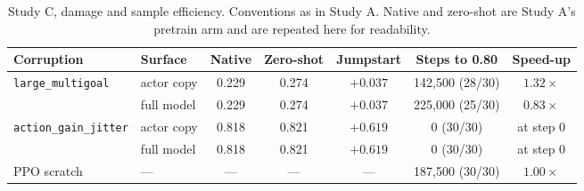 \begin{table}[htbp]
\centering
\setlength{\tabcolsep}{4pt}
\caption{Study C, damage and sample efficiency. Conventions as in Study A.
Native and zero-shot are Study A's pretrain arm and are repeated here for
readability.}
\small
\begin{tabular}{llccccc}
\toprule
Corruption & Surface & Native & Zero-shot & Jumpstart & Steps to 0.80 & Speed-up \\
\midrule
\texttt{large\_multigoal} & actor copy & 0.229 & 0.274 & $+0.037$ & 142,500 (28/30) & $1.32\times$ \\
 & full model & 0.229 & 0.274 & $+0.037$ & 225,000 (25/30) & $0.83\times$ \\
\midrule
\texttt{action\_gain\_jitter} & actor copy & 0.818 & 0.821 & $+0.619$ & 0 (30/30) & at step 0 \\
 & full model & 0.818 & 0.821 & $+0.619$ & 0 (30/30) & at step 0 \\
\midrule
PPO scratch & --- & --- & --- & --- & 187,500 (30/30) & $1.00\times$ \\
\bottomrule
\end{tabular}
\end{table}

